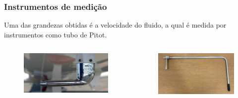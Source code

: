 %
%

\begin{frame}
\frametitle{Instrumentos de medição}

Uma das grandezas obtidas é a velocidade do fluido, a qual é medida por instrumentos como tubo de Pitot.

    \begin{columns}
            \begin{figure}
            \centering
            \includegraphics[scale = 0.6]{figuras/tubodepitotaviao}
            \end{figure}
            \begin{figure}
            \centering
            \includegraphics[scale = 0.16]{figuras/tubodepitotlaboratorio}
            \end{figure}
    \end{columns}
\end{frame}
